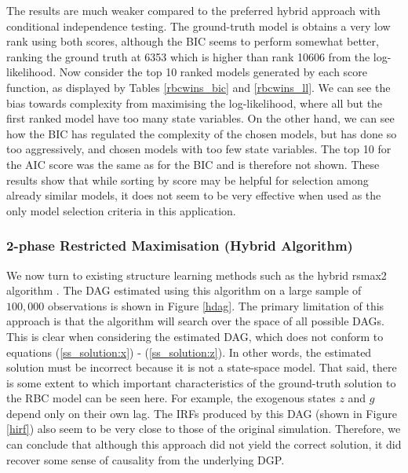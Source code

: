 \documentclass{article}
\begin{document}
The results are much weaker compared to the preferred hybrid approach with conditional independence testing. The ground-truth model is obtains a very low rank using both scores, although the BIC seems to perform somewhat better, ranking the ground truth at 6353 which is higher than rank 10606 from the log-likelihood. Now consider the top 10 ranked models generated by each score function, as displayed by Tables \ref{rbcwins_bic} and \ref{rbcwins_ll}. We can see the bias towards complexity from maximising the log-likelihood, where all but the first ranked model have too many state variables. On the other hand, we can see how the BIC has regulated the complexity of the chosen models, but has done so too aggressively, and chosen models with too few state variables. The top 10 for the AIC score was the same as for the BIC and is therefore not shown. These results show that while sorting by score may be helpful for selection among already similar models, it does not seem to be very effective when used as the only model selection criteria in this application.

\subsubsection{2-phase Restricted Maximisation (Hybrid Algorithm)} \label{rsmax2}

We now turn to existing structure learning methods such as the hybrid rsmax2 algorithm \parencite{scutari2014multiple}. The DAG estimated using this algorithm on a large sample of $100,000$ observations is shown in Figure \ref{hdag}. The primary limitation of this approach is that the algorithm will search over the space of all possible DAGs. This is clear when considering the estimated DAG, which does not conform to equations (\ref{ss_solution:x}) - (\ref{ss_solution:z}). In other words, the estimated solution must be incorrect because it is not a state-space model. That said, there is some extent to which important characteristics of the ground-truth solution to the RBC model can be seen here. For example, the exogenous states $z$ and $g$ depend only on their own lag. The IRFs produced by this DAG (shown in Figure \ref{hirf}) also seem to be very close to those of the original simulation. Therefore, we can conclude that although this approach did not yield the correct solution, it did recover some sense of causality from the underlying DGP.
\end{document}
